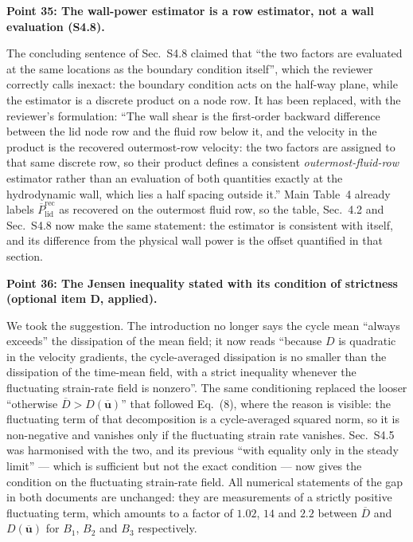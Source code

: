\documentclass[11pt,a4paper]{article}
\begin{document}
\vspace{1em}

\noindent\textbf{Point 35: The wall-power estimator is a row estimator, not a wall
evaluation (S4.8).}

The concluding sentence of Sec.~S4.8 claimed that ``the two factors are evaluated at the
same locations as the boundary condition itself'', which the reviewer correctly calls
inexact: the boundary condition acts on the half-way plane, while the estimator is a
discrete product on a node row. It has been replaced, with the reviewer's formulation:
``The wall shear is the first-order backward difference between the lid node row and the
fluid row below it, and the velocity in the product is the recovered outermost-row
velocity: the two factors are assigned to that same discrete row, so their product
defines a consistent \emph{outermost-fluid-row} estimator rather than an evaluation of
both quantities exactly at the hydrodynamic wall, which lies a half spacing outside
it.'' Main Table~4 already labels $\overline P_{\mathrm{lid}}^{\mathrm{rec}}$ as
recovered on the outermost fluid row, so the table, Sec.~4.2 and Sec.~S4.8 now make the
same statement: the estimator is consistent with itself, and its difference from the
physical wall power is the offset quantified in that section.

\vspace{1em}

\noindent\textbf{Point 36: The Jensen inequality stated with its condition of
strictness (optional item D, applied).}

We took the suggestion. The introduction no longer says the cycle mean ``always
exceeds'' the dissipation of the mean field; it now reads ``because $D$ is quadratic in
the velocity gradients, the cycle-averaged dissipation is no smaller than the
dissipation of the time-mean field, with a strict inequality whenever the fluctuating
strain-rate field is nonzero''. The same conditioning replaced the looser ``otherwise
$\overline D>D(\overline{\mathbf{u}})$'' that followed Eq.~(8), where the reason is
visible: the fluctuating term of that decomposition is a cycle-averaged squared norm, so
it is non-negative and vanishes only if the fluctuating strain rate vanishes. Sec.~S4.5
was harmonised with the two, and its previous ``with equality only in the steady limit''
--- which is sufficient but not the exact condition --- now gives the condition on the
fluctuating strain-rate field. All numerical statements of the gap in both documents are
unchanged: they are measurements of a strictly positive fluctuating term, which amounts
to a factor of $1.02$, $14$ and $2.2$ between $\overline D$ and $D(\overline{\mathbf{u}})$
for $B_1$, $B_2$ and $B_3$ respectively.
\end{document}
